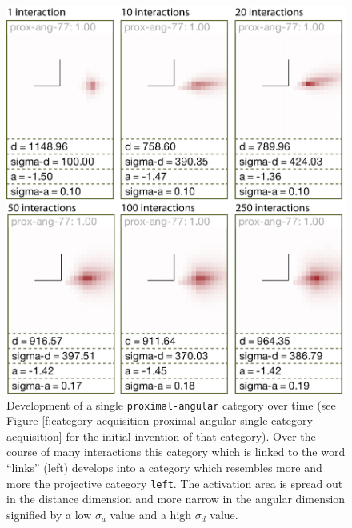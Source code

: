 \begin{figure}
\begin{center}
\includegraphics[width=0.9\columnwidth]{figs/category-acquisition-proximal-angular-category-development-over-time.png}
\end{center}
\caption[Development of a single {\footnotesize\tt proximal-angular} category over time]{
Development of a single {\footnotesize\tt proximal-angular} category over time (see Figure \ref{f:category-acquisition-proximal-angular-single-category-acquisition} for the initial invention of that category). 
Over the course of many interactions this category which is linked to the word ``links'' (left) develops
into a category which resembles more and more the projective category {\footnotesize\tt left}. 
The activation area is spread out in the distance dimension and more narrow in the angular 
dimension signified by a low $\sigma_a$ value and a high $\sigma_d$ value.}
\label{f:category-acquisition-proximal-angular-category-development-over-time}
\end{figure}

